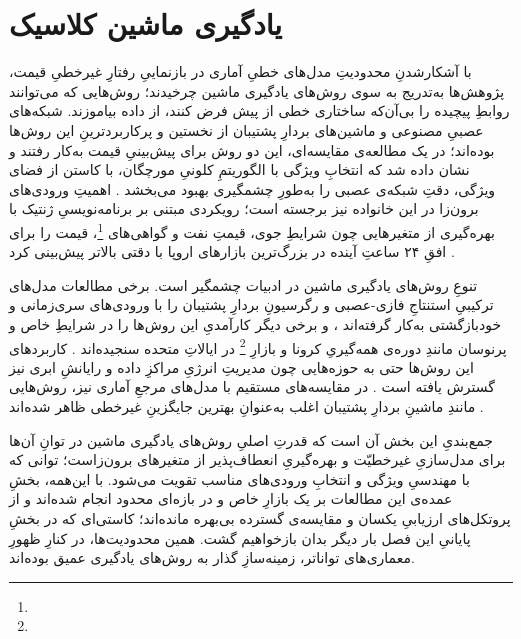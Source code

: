 \section{یادگیری ماشین کلاسیک}

با آشکارشدنِ محدودیتِ مدل‌های خطیِ آماری در بازنماییِ رفتارِ غیرخطیِ قیمت،
پژوهش‌ها به‌تدریج به سوی روش‌های یادگیری ماشین چرخیدند؛ روش‌هایی که می‌توانند
روابطِ پیچیده را بی‌آن‌که ساختاری خطی از پیش فرض کنند، از داده بیاموزند.
شبکه‌های عصبیِ مصنوعی و ماشین‌های بردارِ پشتیبان از نخستین و پرکاربردترینِ این
روش‌ها بوده‌اند؛ در یک مطالعه‌ی مقایسه‌ای، این دو روش برای پیش‌بینیِ قیمت به‌کار
رفتند و نشان داده شد که انتخابِ ویژگی با الگوریتمِ کلونیِ مورچگان، با کاستن از
فضای ویژگی، دقتِ شبکه‌ی عصبی را به‌طورِ چشمگیری بهبود می‌بخشد
\cite{foruzan_comparative_2015}. اهمیتِ ورودی‌های برون‌زا در این خانواده نیز
برجسته است؛ رویکردی مبتنی بر برنامه‌نویسیِ ژنتیک با بهره‌گیری از متغیرهایی چون
شرایطِ جوی، قیمتِ نفت و گواهی‌های \footnote{}، قیمت را برای افقِ ۲۴ ساعتِ آینده
در بزرگ‌ترین بازارهای اروپا با دقتی بالاتر پیش‌بینی کرد
\cite{castelli_forecasting_2020}.

تنوعِ روش‌های یادگیری ماشین در ادبیات چشمگیر است. برخی مطالعات مدل‌های ترکیبیِ
استنتاجِ فازی-عصبی و رگرسیونِ بردارِ پشتیبان را با ورودی‌های سری‌زمانی و
خودبازگشتی به‌کار گرفته‌اند \cite{yousaf_novel_2021}، و برخی دیگر کارآمدیِ این
روش‌ها را در شرایطِ خاص و پرنوسان  مانندِ دوره‌ی همه‌گیریِ کرونا و بازارِ
\footnote{} در ایالاتِ متحده  سنجیده‌اند \cite{arya_machine_2021}.
کاربردهای این روش‌ها حتی به حوزه‌هایی چون مدیریتِ انرژیِ مراکزِ داده و رایانشِ
ابری نیز گسترش یافته است \cite{albahli_electricity_2020}. در مقایسه‌های مستقیم با
مدل‌های مرجعِ آماری نیز، روش‌هایی مانندِ ماشینِ بردارِ پشتیبان اغلب به‌عنوانِ
بهترین جایگزینِ غیرخطی ظاهر شده‌اند \cite{haluzan_performance_2020}.

جمع‌بندیِ این بخش آن است که قدرتِ اصلیِ روش‌های یادگیری ماشین در توانِ آن‌ها برای
مدل‌سازیِ غیرخطیّت و بهره‌گیریِ انعطاف‌پذیر از متغیرهای برون‌زاست؛ توانی که با
مهندسیِ ویژگی و انتخابِ ورودی‌های مناسب تقویت می‌شود. با این‌همه، بخشِ عمده‌ی این
مطالعات بر یک بازارِ خاص و در بازه‌ای محدود انجام شده‌اند و از پروتکل‌های
ارزیابیِ یکسان و مقایسه‌ی گسترده بی‌بهره مانده‌اند؛ کاستی‌ای که در بخشِ پایانیِ
این فصل بار دیگر بدان بازخواهیم گشت. همین محدودیت‌ها، در کنارِ ظهورِ معماری‌های
تواناتر، زمینه‌سازِ گذار به روش‌های یادگیری عمیق بوده‌اند.
